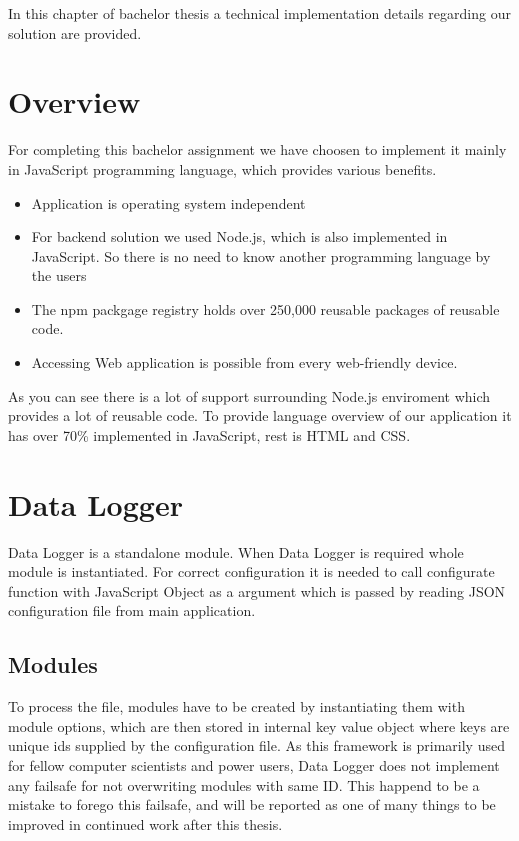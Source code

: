 In this chapter of bachelor thesis a technical implementation details regarding our solution are provided.
\section{Overview} %
\label{sec:overview}
For completing this bachelor assignment we have choosen to implement it mainly in JavaScript programming language, which provides various benefits.
\begin{itemize}
\item Application is operating system independent
\item For backend solution we used Node.js, which is also implemented in JavaScript. So there is no need to know another programming language by the users
\item The npm packgage registry holds over 250,000 reusable packages of reusable code.
\item Accessing Web application is possible from every web-friendly device.
\end{itemize}
As you can see there is a lot of support surrounding Node.js enviroment which provides a lot of reusable code. To provide language overview of our application it has over 70\% implemented in JavaScript, rest is HTML and CSS.
\section{Data Logger} %
\label{sec:data_logger}
Data Logger is a standalone module. When Data Logger is required whole module is instantiated. For correct configuration it is needed to call configurate function with JavaScript Object as a argument which is passed by reading JSON configuration file from main application.
\subsection{Modules} %
\label{sub:modules}
To process the file, modules have to be created by instantiating them with module options, which are then stored in internal key value object where keys are unique ids supplied by the configuration file. As this framework is primarily used for fellow computer scientists and power users, Data Logger does not implement any failsafe for not overwriting modules with same ID. This happend to be a mistake to forego this failsafe, and will be reported as one of many things to be improved in continued work after this thesis.
